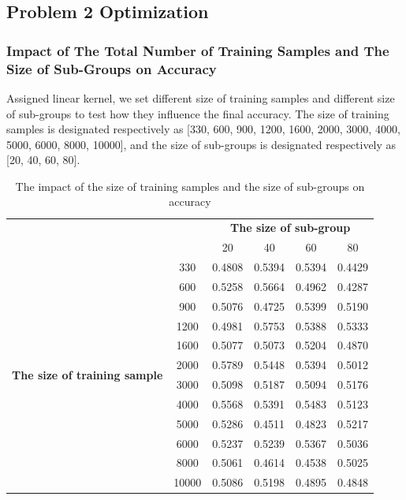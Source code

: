 \subsection{Problem 2 Optimization}

\subsubsection{Impact of The Total Number of Training Samples and The Size of Sub-Groups on Accuracy}
Assigned linear kernel, we set different size of training samples and different size of sub-groups to test how they influence the final accuracy. The size of training samples is designated respectively as [330, 600, 900, 1200, 1600, 2000, 3000, 4000, 5000, 6000, 8000, 10000], and the size of sub-groups is designated respectively as [20, 40, 60, 80].

\begin{table}[h!]
\centering
\begin{tabular}{||c  c || c  c  c c ||} 
\hline
&  & \multicolumn{4}{c||}{\textbf{The size of sub-group}}\\ [0.5ex] 
& & 20 & 40 & 60 & 80 \\\hline\hline
\multirow{12}{8em}{\textbf{The size of training sample}} & 330   & 0.4808 & 0.5394 & 0.5394 & 0.4429\\
& 600   & 0.5258 & 0.5664 & 0.4962 & 0.4287\\
& 900   & 0.5076 & 0.4725 & 0.5399 & 0.5190\\
& 1200  & 0.4981 & 0.5753 & 0.5388 & 0.5333\\
& 1600  & 0.5077 & 0.5073 & 0.5204 & 0.4870\\
& 2000  & 0.5789 & 0.5448 & 0.5394 & 0.5012\\
& 3000  & 0.5098 & 0.5187 & 0.5094 & 0.5176\\
& 4000  & 0.5568 & 0.5391 & 0.5483 & 0.5123\\
& 5000  & 0.5286 & 0.4511 & 0.4823 & 0.5217\\
& 6000  & 0.5237 & 0.5239 & 0.5367 & 0.5036\\
& 8000  & 0.5061 & 0.4614 & 0.4538 & 0.5025\\
& 10000 & 0.5086 & 0.5198 & 0.4895 & 0.4848\\[1ex] 
\hline
\end{tabular}
\caption{The impact of the size of training samples and the size of sub-groups on accuracy}
\label{table:The impact of the size of training samples and the size of sub-groups on accuracy}
\end{table}

